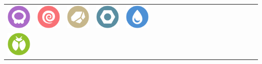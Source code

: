 \begin{table}[h]
\begin{tabular}{c c c c c c c c c c c c c c c c c c c c}
    \includegraphics[scale=.1]{images/poison.png} &
    \includegraphics[scale=.1]{images/psychic.png} &
    \includegraphics[scale=.1]{images/rock.png} &
    \includegraphics[scale=.1]{images/steel.png} &
    \includegraphics[scale=.1]{images/water.png} \\
  \includegraphics[scale=.1]{images/bug.png} \\

\end{tabular}
\end{table}
